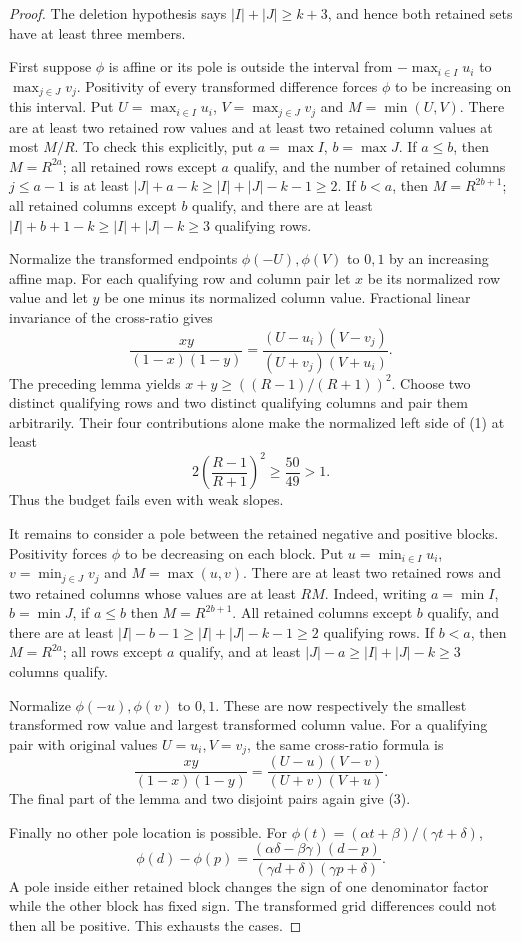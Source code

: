 \documentclass[11pt]{article}
\begin{document}
\begin{proof}
The deletion hypothesis says $|I|+|J|\geq k+3$, and hence both retained
sets have at least three members.

First suppose $\phi$ is affine or its pole is outside the interval
from $-\max_{i\in I}u_i$ to $\max_{j\in J}v_j$. Positivity of every
transformed difference forces $\phi$ to be increasing on this interval.
Put $U=\max_{i\in I}u_i$, $V=\max_{j\in J}v_j$ and
$M=\min(U,V)$. There are at least two retained row values and at least
two retained column values at most $M/R$.
To check this explicitly, put $a=\max I$, $b=\max J$. If $a\leq b$,
then $M=R^{2a}$; all retained rows except $a$ qualify, and the number
of retained columns $j\leq a-1$ is at least
$|J|+a-k\geq|I|+|J|-k-1\geq2$.
If $b<a$, then $M=R^{2b+1}$; all retained columns except $b$ qualify,
and there are at least $|I|+b+1-k\geq|I|+|J|-k\geq3$ qualifying
rows.

Normalize the transformed endpoints $\phi(-U),\phi(V)$ to $0,1$ by
an increasing affine map. For each qualifying row and column pair let
$x$ be its normalized row value and let $y$ be one minus its normalized
column value. Fractional linear invariance of the cross-ratio gives
\[
 \frac{xy}{(1-x)(1-y)}
 =\frac{(U-u_i)(V-v_j)}{(U+v_j)(V+u_i)}.
\]
The preceding lemma yields
$x+y\geq((R-1)/(R+1))^2$. Choose two distinct qualifying rows and
two distinct qualifying columns and pair them arbitrarily. Their four
contributions alone make the normalized left side of (1) at least
\[
 2\left(\frac{R-1}{R+1}\right)^2
 \geq\frac{50}{49}>1.
 \tag{3}
\]
Thus the budget fails even with weak slopes.

It remains to consider a pole between the retained negative and
positive blocks. Positivity forces $\phi$ to be decreasing on each
block. Put $u=\min_{i\in I}u_i$, $v=\min_{j\in J}v_j$ and
$M=\max(u,v)$. There are at least two retained rows and two retained
columns whose values are at least $RM$. Indeed, writing
$a=\min I$, $b=\min J$, if $a\leq b$ then $M=R^{2b+1}$.
All retained columns except $b$ qualify, and there are at least
$|I|-b-1\geq|I|+|J|-k-1\geq2$ qualifying rows. If $b<a$, then
$M=R^{2a}$; all rows except $a$ qualify, and at least
$|J|-a\geq|I|+|J|-k\geq3$ columns qualify.

Normalize $\phi(-u),\phi(v)$ to $0,1$. These are now respectively
the smallest transformed row value and largest transformed column
value. For a qualifying pair with original values $U=u_i,V=v_j$,
the same cross-ratio formula is
\[
 \frac{xy}{(1-x)(1-y)}
 =\frac{(U-u)(V-v)}{(U+v)(V+u)}.
\]
The final part of the lemma and two disjoint pairs again give (3).

Finally no other pole location is possible. For
$\phi(t)=(\alpha t+\beta)/(\gamma t+\delta)$,
\[
 \phi(d)-\phi(p)=
 \frac{(\alpha\delta-\beta\gamma)(d-p)}
 {(\gamma d+\delta)(\gamma p+\delta)}.
\]
A pole inside either retained block changes the sign of one denominator
factor while the other block has fixed sign. The transformed grid
differences could not then all be positive. This exhausts the cases.
\end{proof}
\end{document}
